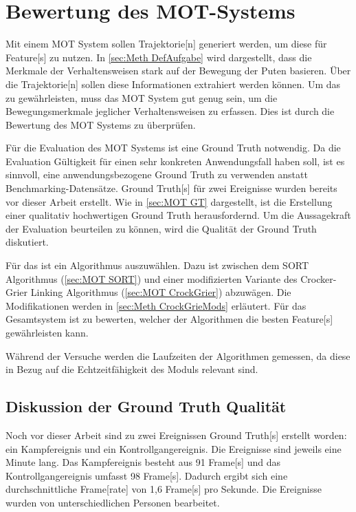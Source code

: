 \section{Bewertung des MOT-Systems} \label{sec:Meth MOT}
Mit einem \gls{MOT} System sollen \gls{Trajektorie}[n] generiert werden, um diese für \gls{Feature}[s] zu nutzen. In \ref{sec:Meth DefAufgabe} wird dargestellt, dass die Merkmale der Verhaltensweisen stark auf der Bewegung der Puten basieren. Über die \gls{Trajektorie}[n] sollen diese Informationen extrahiert werden können. Um das zu gewährleisten, muss das \gls{MOT} System gut genug sein, um die Bewegungsmerkmale jeglicher Verhaltensweisen zu erfassen. Dies ist durch die Bewertung des \gls{MOT} Systems zu überprüfen. \par

Für die Evaluation des \gls{MOT} Systems ist eine \gls{Ground Truth} notwendig. Da die Evaluation Gültigkeit für einen sehr konkreten Anwendungsfall haben soll, ist es sinnvoll, eine anwendungsbezogene \gls{Ground Truth} zu verwenden anstatt Benchmarking-Datensätze. \gls{Ground Truth}[s] für zwei Ereignisse wurden bereits vor dieser Arbeit erstellt. Wie in \ref{sec:MOT GT} dargestellt, ist die Erstellung einer qualitativ hochwertigen \gls{Ground Truth} herausfordernd. Um die Aussagekraft der Evaluation beurteilen zu können, wird die Qualität der \gls{Ground Truth} diskutiert. \par

Für das  ist ein Algorithmus auszuwählen. Dazu ist zwischen dem \acrshort{SORT} Algorithmus (\autoref{sec:MOT SORT}) und einer modifizierten Variante des Crocker-Grier Linking Algorithmus (\autoref{sec:MOT CrockGrier}) abzuwägen. Die Modifikationen werden in \autoref{sec:Meth CrockGrieMods} erläutert. Für das Gesamtsystem ist zu bewerten, welcher der Algorithmen die besten \gls{Feature}[s] gewährleisten kann. \par

Während der Versuche werden die Laufzeiten der Algorithmen gemessen, da diese  in Bezug auf die Echtzeitfähigkeit des Moduls relevant sind. 


\subsection{Diskussion der Ground Truth Qualität} \label{sec:Meth GT Quali}
Noch vor dieser Arbeit sind zu zwei Ereignissen \gls{Ground Truth}[s] erstellt worden:  ein Kampfereignis und ein Kontrollgangereignis. Die Ereignisse sind jeweils eine Minute lang. Das Kampfereignis besteht aus 91 \gls{Frame}[s] und das Kontrollgangereignis umfasst 98 \gls{Frame}[s]. Dadurch ergibt sich eine durchschnittliche \gls{Frame}[rate] von 1,6 \gls{Frame}[s] pro Sekunde. Die Ereignisse wurden von unterschiedlichen Personen bearbeitet.  \par

